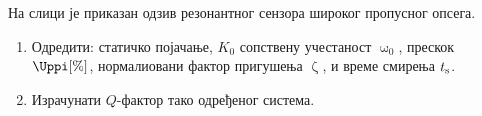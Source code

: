 \PID
На слици је приказан одзив резонантног сензора широког пропусног опсега. 
\begin{enumerate}[label=(\alph*)]
\item Одредити: 
статичко појачање, $K_0$
сопствену учестаност $\upomega_{0}$,
прескок $\Uppi [\%]$,
нормалиовани фактор пригушења $\upzeta$, и 
време смирења $t_{\rm s}$.
\item Израчунати $Q$-фактор тако одређеног система.
\end{enumerate}
